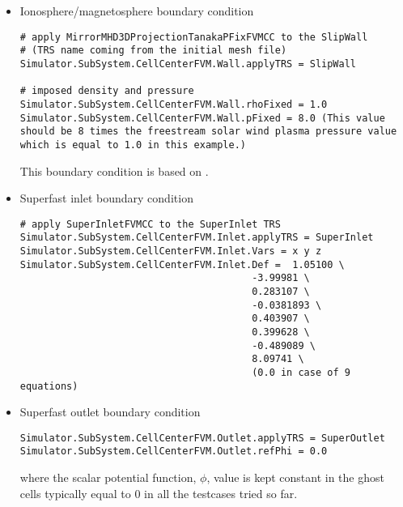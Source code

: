 \documentclass[11pt]{article}
\begin{document}
\begin{itemize}
\item
Ionosphere/magnetosphere boundary condition \cite{phd:yalim, yalim11jgr}

\begin{lstlisting}[breaklines]
# apply MirrorMHD3DProjectionTanakaPFixFVMCC to the SlipWall 
# (TRS name coming from the initial mesh file)
Simulator.SubSystem.CellCenterFVM.Wall.applyTRS = SlipWall

# imposed density and pressure 
Simulator.SubSystem.CellCenterFVM.Wall.rhoFixed = 1.0
Simulator.SubSystem.CellCenterFVM.Wall.pFixed = 8.0 (This value should be 8 times the freestream solar wind plasma pressure value which is equal to 1.0 in this example.) 
\end{lstlisting}
This boundary condition is based on \cite{powell99}.
\item
Superfast inlet boundary condition \cite{yalim08, phd:yalim, yalim11jcp, yalim11jgr}

\begin{lstlisting}[breaklines]
# apply SuperInletFVMCC to the SuperInlet TRS 
Simulator.SubSystem.CellCenterFVM.Inlet.applyTRS = SuperInlet
Simulator.SubSystem.CellCenterFVM.Inlet.Vars = x y z
Simulator.SubSystem.CellCenterFVM.Inlet.Def =  1.05100 \
                                        -3.99981 \
                                        0.283107 \
                                        -0.0381893 \
                                        0.403907 \
                                        0.399628 \
                                        -0.489089 \
                                        8.09741 \
                                        (0.0 in case of 9 equations)
\end{lstlisting}

\item
Superfast outlet boundary condition \cite{yalim08, phd:yalim, yalim11jcp, yalim11jgr}

\begin{lstlisting}[breaklines]
Simulator.SubSystem.CellCenterFVM.Outlet.applyTRS = SuperOutlet
Simulator.SubSystem.CellCenterFVM.Outlet.refPhi = 0.0
\end{lstlisting}
where the scalar potential function, $\phi$, value is kept constant in the ghost cells typically equal to 0 in all the testcases tried so far.
\end{itemize}
\end{document}
